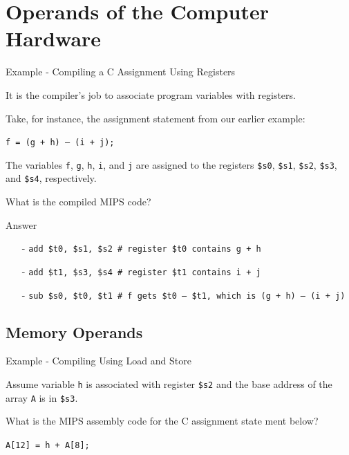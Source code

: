 \section{Operands of the Computer Hardware}
\begin{frame}{Example - Compiling a C Assignment Using Registers}
\begin{flushleft}
It is the compiler’s job to associate program variables with registers. 

Take, for instance, the assignment statement from our earlier example:

\hspace{8mm}\texttt{f = (g + h) – (i + j);}

The variables \texttt{f}, \texttt{g}, \texttt{h}, \texttt{i}, and \texttt{j} are assigned to the registers \texttt{\$s0}, \texttt{\$s1}, \texttt{\$s2}, \texttt{\$s3},
and \texttt{\$s4}, respectively. 

What is the compiled MIPS code?
\end{flushleft}
\end{frame}

\begin{frame}[fragile]{Answer}
\begin{itemize}
\item[-]
\texttt{add \$t0, \$s1, \$s2  \# register \$t0 contains g + h}

\item[-]
\texttt{add \$t1, \$s3, \$s4  \# register \$t1 contains i + j}

\item[-]
\texttt{sub \$s0, \$t0, \$t1  \# f gets \$t0 – \$t1, which is (g + h) – (i + j)}
\end{itemize}
\end{frame}

\subsection{Memory Operands}
\begin{frame}{Example - Compiling Using Load and Store}
\begin{flushleft}
Assume variable \texttt{h} is associated with register \texttt{\$s2} and the base address of the array \texttt{A} is in \texttt{\$s3}. 

What is the MIPS assembly code for the C assignment state­
ment below?

\hspace{8mm}\texttt{A[12] = h + A[8];}
\end{flushleft}
\end{frame}

